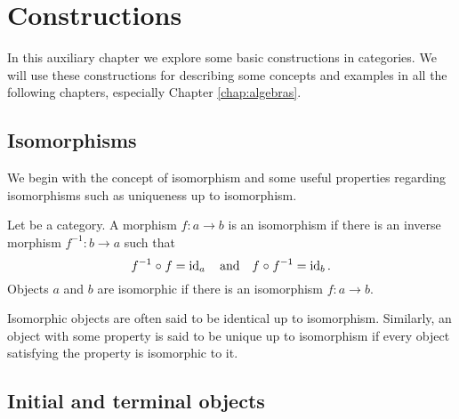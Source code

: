 \chapter{Constructions}
\label{chap:constructions}

In this auxiliary chapter we explore some basic constructions in
categories. We will use these constructions for describing some
concepts and examples in all the following chapters, especially
Chapter \ref{chap:algebras}.

\section{Isomorphisms}
\label{sec:constructions-isomorphisms}

We begin with the concept of isomorphism and some useful properties
regarding isomorphisms such as uniqueness up to isomorphism.

\begin{definition}
  \label{def:isomorphism}


  Let  be a category. A morphism $f: a \to b$ is an isomorphism
  if there is an inverse morphism $f^{-1}: b \to a$ such that
  \begin{equation}
    \label{eq:isomorphism}
    f^{-1} \mathrel{\circ} f = \operatorname{id}_{a}
    \quad
    \text{and}
    \quad
    f \mathrel{\circ} f^{-1} = \operatorname{id}_{b}
    \text{.}
  \end{equation}
  Objects $a$ and $b$ are isomorphic if there is an
  isomorphism $f: a \to b$.

\end{definition}

\begin{definition}
  \label{def:up-to-isomorphism}


  Isomorphic objects are often said to be identical up to isomorphism.
  Similarly, an object with some property is said to be unique up to
  isomorphism if every object satisfying the property is isomorphic to
  it.

\end{definition}

\section{Initial and terminal objects}
\label{sec:constructions-initial-terminal-objects}


